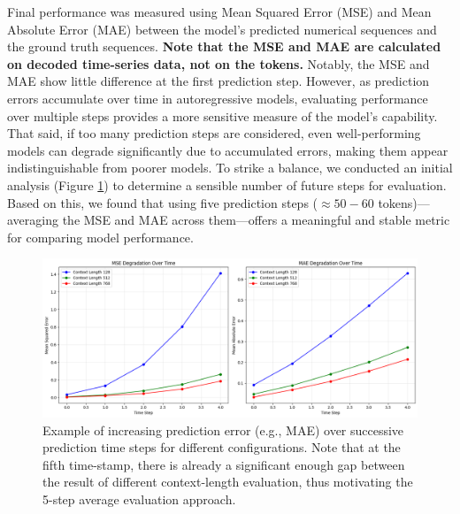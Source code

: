 \documentclass{article}
\begin{document}
Final performance was measured using Mean Squared Error (MSE) and Mean Absolute Error (MAE) between the model's predicted numerical sequences and the ground truth sequences. \textbf{Note that the MSE and MAE are calculated on decoded time-series data, not on the tokens.} Notably, the MSE and MAE show little difference at the first prediction step. However, as prediction errors accumulate over time in autoregressive models, evaluating performance over multiple steps provides a more sensitive measure of the model’s capability. That said, if too many prediction steps are considered, even well-performing models can degrade significantly due to accumulated errors, making them appear indistinguishable from poorer models. To strike a balance, we conducted an initial analysis (Figure \ref{fig:metric-diff-between-timestamp}) to determine a sensible number of future steps for evaluation. Based on this, we found that using five prediction steps ($\approx 50 - 60$ tokens)—averaging the MSE and MAE across them—offers a meaningful and stable metric for comparing model performance.


\begin{figure}[!htbp] %
    \centering
    \includegraphics[width=0.9\linewidth]{M2 Course Work//Images/metric_diff_between_timestamp.png} %
    \caption{Example of increasing prediction error (e.g., MAE) over successive prediction time steps for different configurations. Note that at the fifth time-stamp, there is already a significant enough gap between the result of different context-length evaluation, thus motivating the 5-step average evaluation approach.} %
    \label{fig:metric-diff-between-timestamp}
\end{figure}
\end{document}
